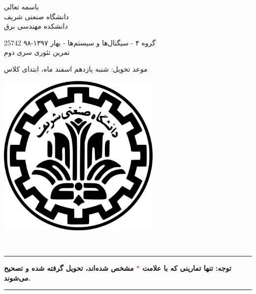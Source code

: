 \documentclass[a4paper]{article}
\begin{document}
	\begin{minipage}{0.6\textwidth}
		
		\begin{center}
			\begin{bf}
				باسمه تعالی\\
				\vspace{0.25cm}
				دانشگاه صنعتی شریف\\
				\vspace{0.25cm}
				دانشکده مهندسی برق\\
				\vspace{0.5cm}
				
				\large
				25742 گروه ۴ - سیگنال‌ها و سیستم‌ها - بهار ۱۳۹۷-۹۸\\
				\Large
				\vspace{0.4cm}
				تمرین تئوری سری دوم\\
				\vspace{0.3cm}
			\end{bf}
			\small{موعد تحویل: شنبه یازدهم اسفند ماه، ابتدای کلاس}
			
			
		\end{center}
		\normalsize
	\end{minipage} \hfill
	\begin{minipage}{0.35\textwidth}
		
		\begin{flushleft}
			\includegraphics[width=0.6\textwidth]{Shariflogo.png}\\ \large
		\end{flushleft}
		
	\end{minipage}
	\\
	
	\rule[0.1\baselineskip]{\textwidth}{1.5pt}
	\textbf{
		توجه: تنها تمارینی که با علامت
		\textcolor{red}{$\ast$}
		مشخص شده‌اند، تحویل گرفته شده و تصحیح می‌شوند.}\\
	\rule[0.1\baselineskip]{\textwidth}{1.5pt}\par
	
\end{document}
